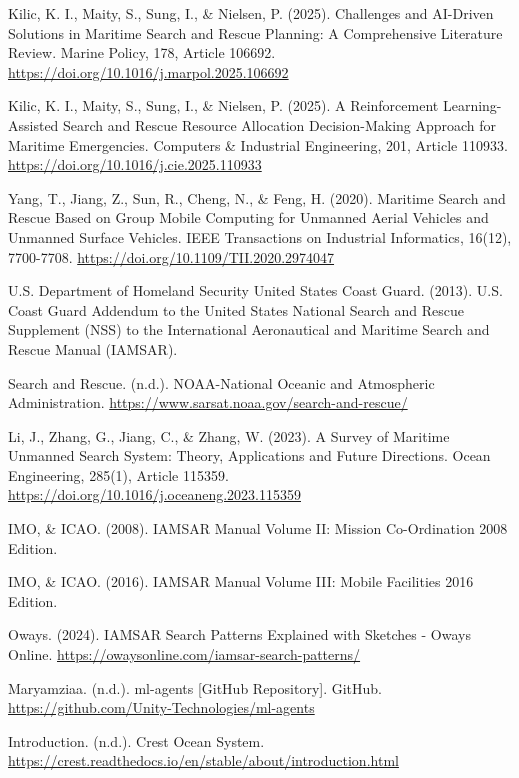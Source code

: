 \documentclass[12pt,a4paper]{article}
\begin{document}
\begin{thebibliography}{9}
Kilic, K. I., Maity, S., Sung, I., \& Nielsen, P. (2025). 
Challenges and AI-Driven Solutions in Maritime Search and Rescue Planning: A Comprehensive Literature Review. 
Marine Policy, 178, Article 106692. 
\url{https://doi.org/10.1016/j.marpol.2025.106692}

Kilic, K. I., Maity, S., Sung, I., \& Nielsen, P. (2025). 
A Reinforcement Learning-Assisted Search and Rescue Resource Allocation Decision-Making Approach for Maritime Emergencies. 
Computers \& Industrial Engineering, 201, Article 110933. 
\url{https://doi.org/10.1016/j.cie.2025.110933}

Yang, T., Jiang, Z., Sun, R., Cheng, N., \& Feng, H. (2020). 
Maritime Search and Rescue Based on Group Mobile Computing for Unmanned Aerial Vehicles and Unmanned Surface Vehicles. 
IEEE Transactions on Industrial Informatics, 16(12), 7700-7708. 
\url{https://doi.org/10.1109/TII.2020.2974047}

U.S. Department of Homeland Security United States Coast Guard. (2013). 
U.S. Coast Guard Addendum to the United States National Search and Rescue Supplement (NSS) to the International Aeronautical and Maritime Search and Rescue Manual (IAMSAR).

Search and Rescue. (n.d.). 
NOAA-National Oceanic and Atmospheric Administration. 
\url{https://www.sarsat.noaa.gov/search-and-rescue/}

Li, J., Zhang, G., Jiang, C., \& Zhang, W. (2023). 
A Survey of Maritime Unmanned Search System: Theory, Applications and Future Directions. 
Ocean Engineering, 285(1), Article 115359. 
\url{https://doi.org/10.1016/j.oceaneng.2023.115359}

IMO, \& ICAO. (2008). 
IAMSAR Manual Volume II: Mission Co-Ordination 2008 Edition.

IMO, \& ICAO. (2016). 
IAMSAR Manual Volume III: Mobile Facilities 2016 Edition.

Oways. (2024). 
IAMSAR Search Patterns Explained with Sketches - Oways Online. 
\url{https://owaysonline.com/iamsar-search-patterns/}

Maryamziaa. (n.d.). 
ml-agents [GitHub Repository]. 
GitHub. 
\url{https://github.com/Unity-Technologies/ml-agents}

Introduction. (n.d.). 
Crest Ocean System. 
\url{https://crest.readthedocs.io/en/stable/about/introduction.html}


\end{thebibliography}
\end{document}
